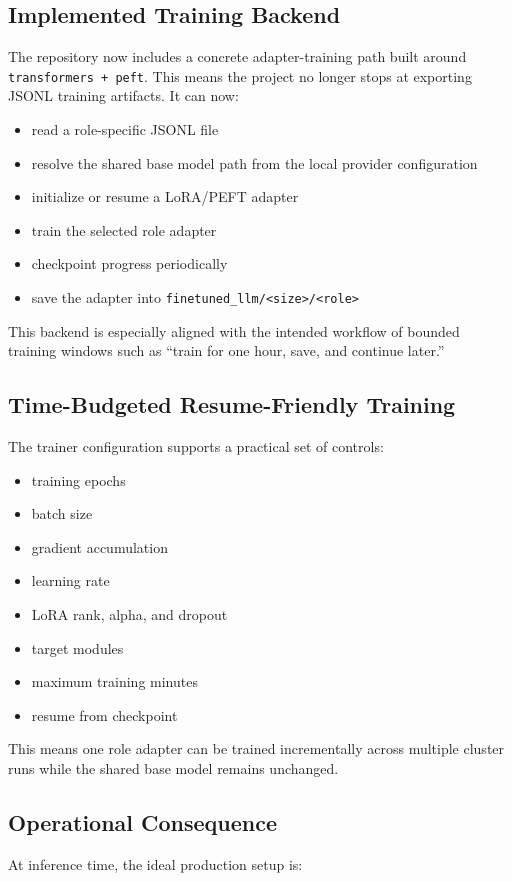 \documentclass[11pt]{book}
\begin{document}
\subsection*{Implemented Training Backend}
The repository now includes a concrete adapter-training path built around
\texttt{transformers + peft}. This means the project no longer stops at exporting JSONL training
artifacts. It can now:

\begin{itemize}
\item read a role-specific JSONL file
\item resolve the shared base model path from the local provider configuration
\item initialize or resume a LoRA/PEFT adapter
\item train the selected role adapter
\item checkpoint progress periodically
\item save the adapter into \texttt{finetuned\_llm/<size>/<role>}
\end{itemize}

This backend is especially aligned with the intended workflow of bounded training windows such as
``train for one hour, save, and continue later.''

\subsection*{Time-Budgeted Resume-Friendly Training}
The trainer configuration supports a practical set of controls:

\begin{itemize}
\item training epochs
\item batch size
\item gradient accumulation
\item learning rate
\item LoRA rank, alpha, and dropout
\item target modules
\item maximum training minutes
\item resume from checkpoint
\end{itemize}

This means one role adapter can be trained incrementally across multiple cluster runs while the
shared base model remains unchanged.

\subsection*{Operational Consequence}
At inference time, the ideal production setup is:
\end{document}
